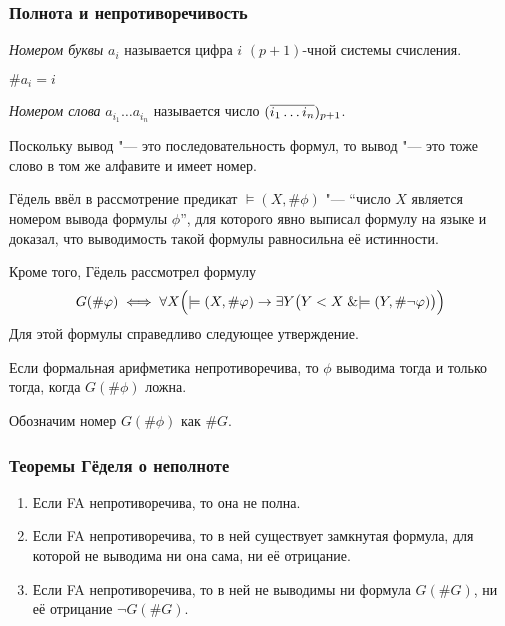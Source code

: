 \subsubsection*{Полнота и непротиворечивость}

\begin{definition}
	\emph{Номером буквы} $ a_i $ называется цифра $ i $ $ (p + 1) $-чной системы счисления.
\end{definition}

\begin{notation}
	$ \# a_i = i $
\end{notation}

\begin{definition}
	\emph{Номером слова} $ a_{i_1} \dots a_{i_n} $ называется число $ (\overline{i_1 \dots i_n})_{p + 1} $.
\end{definition}

Поскольку вывод "--- это последовательность формул, то вывод "--- это тоже слово в том же алфавите и имеет номер.

Гёдель ввёл в рассмотрение предикат $ \models (X, \#\phi) $ "--- ``число $ X $ является номером вывода формулы $ \phi $'', для которого явно выписал формулу на языке  и доказал, что выводимость такой формулы равносильна её истинности.

Кроме того, Гёдель рассмотрел формулу
$$ G(\#\varphi) \iff \forall X \Bigl( \models (X, \#\varphi) \to \exists Y \bigl( Y < X \mathrel\& \models (Y, \#\neg \varphi) \bigr) \Bigr) $$
Для этой формулы справедливо следующее утверждение.

\begin{statement}
	Если формальная арифметика непротиворечива, то $ \phi $ выводима тогда и только тогда, когда $ G(\# \phi) $ ложна.
\end{statement}

Обозначим номер $ G(\# \phi) $ как $ \#G $.

\subsubsection*{Теоремы Гёделя о неполноте}

\begin{theorem}
	\hfill
	\begin{enumerate}
		\item Если FA непротиворечива, то она не полна.
		\item Если FA непротиворечива, то в ней существует замкнутая формула, для которой не выводима ни она сама, ни её отрицание.
		\item Если FA непротиворечива, то в ней не выводимы ни формула $ G(\# G) $, ни её отрицание $ \neg G(\#G) $.
	\end{enumerate}
\end{theorem}

